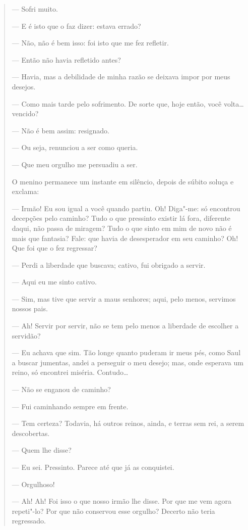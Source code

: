 \begin{quote}
--- Sofri muito.

--- E é isto que o faz dizer: estava errado?

--- Não, não é bem isso: foi isto que me fez refletir.

--- Então não havia refletido antes?

--- Havia, mas a debilidade de minha razão se deixava impor por meus
desejos.

--- Como mais tarde pelo sofrimento. De sorte que, hoje então, você volta\ldots{} vencido?

--- Não é bem assim: resignado.

--- Ou seja, renunciou a ser como queria.

--- Que meu orgulho me persuadiu a ser.

O menino permanece um instante em silêncio, depois de súbito soluça e
exclama:

--- Irmão! Eu sou igual a você quando partiu. Oh! Diga"-me: só encontrou
decepções pelo caminho? Tudo o que pressinto existir lá fora, diferente
daqui, não passa de miragem? Tudo o que sinto em mim de novo não é mais
que fantasia? Fale: que havia de desesperador em seu caminho? Oh! Que
foi que o fez regressar?

--- Perdi a liberdade que buscava; cativo, fui obrigado a servir.

--- Aqui eu me sinto cativo.

--- Sim, mas tive que servir a maus senhores; aqui, pelo menos, servimos
nossos pais.

--- Ah! Servir por servir, não se tem pelo menos a liberdade de escolher a
servidão?

--- Eu achava que sim. Tão longe quanto puderam ir meus pés, como Saul a
buscar jumentas, andei a perseguir o meu desejo; mas, onde esperava um
reino, só encontrei miséria. Contudo\ldots{}

--- Não se enganou de caminho?

--- Fui caminhando sempre em frente.

--- Tem certeza? Todavia, há outros reinos, ainda, e terras sem rei, a
serem descobertas.

--- Quem lhe disse?

--- Eu sei. Pressinto. Parece até que já as conquistei.

--- Orgulhoso!

--- Ah! Ah! Foi isso o que nosso irmão lhe disse. Por que me vem agora
repeti"-lo? Por que não conservou esse orgulho? Decerto não teria
regressado.


\end{quote}
